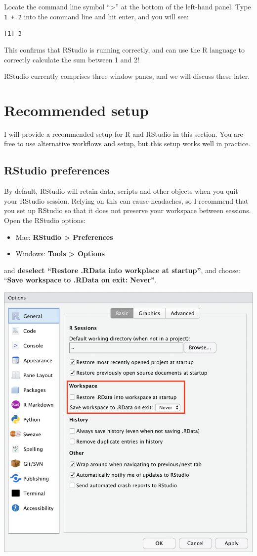 \documentclass[
]{memoir}
\begin{document}
Locate the command line symbol ``\textgreater{}'' at the bottom of the left-hand panel. Type \texttt{1\ +\ 2} into the command line and hit enter, and you will see:

\texttt{{[}1{]}\ 3}

This confirms that RStudio is running correctly, and can use the R language to correctly calculate the sum between 1 and 2!

RStudio currently comprises three window panes, and we will discuss these later.

\hypertarget{recommended-setup}{%
\section{Recommended setup}\label{recommended-setup}}

I will provide a recommended setup for R and RStudio in this section. You are free to use alternative workflows and setup, but this setup works well in practice.

\hypertarget{rstudio-preferences}{%
\subsection{RStudio preferences}\label{rstudio-preferences}}

By default, RStudio will retain data, scripts and other objects when you quit your RStudio session. Relying on this can cause headaches, so I recommend that you set up RStudio so that it does not preserve your workspace between sessions. Open the RStudio options:

\begin{itemize}
\item
  Mac: \textbf{RStudio \textgreater{} Preferences}
\item
  Windows: \textbf{Tools \textgreater{} Options}
\end{itemize}

and \textbf{deselect ``Restore .RData into workplace at startup''}, and choose: ``\textbf{Save workspace to .RData on exit:} \textbf{Never''}.

\includegraphics[width=0.75\linewidth]{img/RStudio-preferences}
\end{document}
